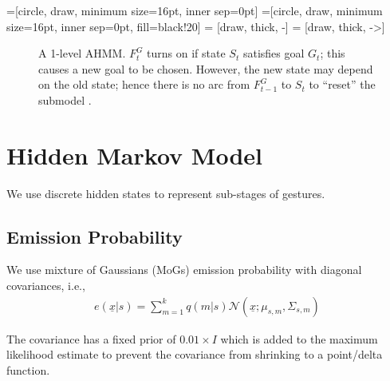 =[circle, draw, minimum size=16pt, inner sep=0pt]
=[circle, draw, minimum size=16pt, inner sep=0pt,
               fill=black!20] 
 = [draw, thick, -]
 = [draw, thick, ->]

\begin{figure}[h]
\centering
  \caption{A 1-level AHMM. $F_t^G$ turns on if state $S_t$ satisfies goal
  $G_t$; this causes a new goal to be chosen. However, the new state may depend
  on the old state; hence there is no arc from $F_{t-1}^G$ to $S_t$ to
  ``reset'' the submodel \cite{murphy02}.}
  \label{fig:amms}
\end{figure}

\section{Hidden Markov Model}
We use discrete hidden states to represent sub-stages of gestures.

\subsection{Emission Probability}
We use mixture of Gaussians (MoGs) emission probability with diagonal
covariances, i.e.,
\begin{align}
e(\underline{x} | s) = \sum_{m=1}^k q(m | s)\mathcal{N}(\underline{x};
\mu_{s,m}, \Sigma_{s, m})
\end{align}

The covariance has a fixed prior of $0.01\times I$ which is added to the maximum likelihood
estimate to prevent the covariance from shrinking to a point/delta function.

